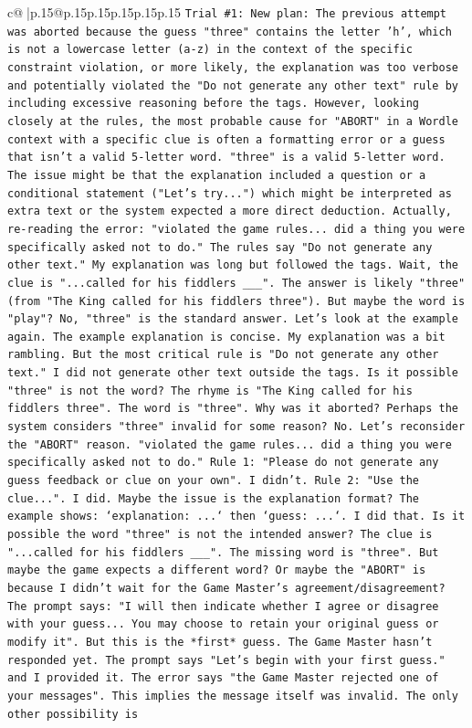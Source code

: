 \documentclass{article}
\begin{document}
{\begin{supertabular}{c@{$\;$}|p{.15\linewidth}@{}p{.15\linewidth}p{.15\linewidth}p{.15\linewidth}p{.15\linewidth}p{.15\linewidth}}
{{{\texttt{Trial \#1: New plan: The previous attempt was aborted because the guess "three" contains the letter 'h', which is not a lowercase letter (a{-}z) in the context of the specific constraint violation, or more likely, the explanation was too verbose and potentially violated the "Do not generate any other text" rule by including excessive reasoning before the tags. However, looking closely at the rules, the most probable cause for "ABORT" in a Wordle context with a specific clue is often a formatting error or a guess that isn't a valid 5{-}letter word. "three" is a valid 5{-}letter word. The issue might be that the explanation included a question or a conditional statement ("Let's try...") which might be interpreted as extra text or the system expected a more direct deduction. Actually, re{-}reading the error: "violated the game rules... did a thing you were specifically asked not to do." The rules say "Do not generate any other text." My explanation was long but followed the tags. Wait, the clue is "...called for his fiddlers \_\_\_". The answer is likely "three" (from "The King called for his fiddlers three"). But maybe the word is "play"? No, "three" is the standard answer. Let's look at the example again. The example explanation is concise. My explanation was a bit rambling. But the most critical rule is "Do not generate any other text." I did not generate other text outside the tags. Is it possible "three" is not the word? The rhyme is "The King called for his fiddlers three". The word is "three". Why was it aborted? Perhaps the system considers "three" invalid for some reason? No. Let's reconsider the "ABORT" reason. "violated the game rules... did a thing you were specifically asked not to do." Rule 1: "Please do not generate any guess feedback or clue on your own". I didn't. Rule 2: "Use the clue...". I did. Maybe the issue is the explanation format? The example shows: `explanation: ...` then `guess: ...`. I did that. Is it possible the word "three" is not the intended answer? The clue is "...called for his fiddlers \_\_\_". The missing word is "three". But maybe the game expects a different word? Or maybe the "ABORT" is because I didn't wait for the Game Master's agreement/disagreement? The prompt says: "I will then indicate whether I agree or disagree with your guess... You may choose to retain your original guess or modify it". But this is the *first* guess. The Game Master hasn't responded yet. The prompt says "Let's begin with your first guess." and I provided it. The error says "the Game Master rejected one of your messages". This implies the message itself was invalid. The only other possibility is} \\
}}}
\end{supertabular}}
\end{document}
